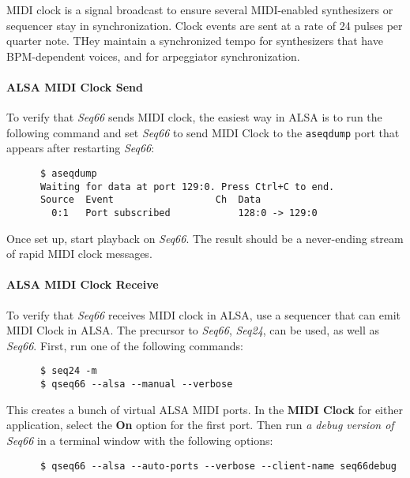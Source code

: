    MIDI clock is a signal broadcast to ensure
   several MIDI-enabled synthesizers or sequencer stay in
   synchronization. Clock events are sent at a rate of 24 pulses per quarter
   note.  THey maintain a synchronized tempo for synthesizers
   that have BPM-dependent voices, and for arpeggiator synchronization.

\paragraph{ALSA MIDI Clock Send}
\label{paragraph:alsa_testing_midi_clock_send}

   To verify that \textsl{Seq66} sends MIDI clock, the easiest way in
   ALSA is to run the following command and set \textsl{Seq66} to send
   MIDI Clock to the \texttt{aseqdump} port that appears after restarting
   \textsl{Seq66}:

   \begin{verbatim}
      $ aseqdump
      Waiting for data at port 129:0. Press Ctrl+C to end.
      Source  Event                  Ch  Data
        0:1   Port subscribed            128:0 -> 129:0
   \end{verbatim}

   Once set up, start playback on \textsl{Seq66}.
   The result should be a never-ending stream of rapid MIDI clock messages.

\paragraph{ALSA MIDI Clock Receive}
\label{paragraph:alsa_testing_midi_clock_receive}

   To verify that \textsl{Seq66} receives MIDI clock in ALSA, use a sequencer
   that can emit MIDI Clock in ALSA.  The precursor to \textsl{Seq66},
   \textsl{Seq24}, can be used, as well as \textsl{Seq66}.
   First, run one of the following commands:

   \begin{verbatim}
      $ seq24 -m
      $ qseq66 --alsa --manual --verbose
   \end{verbatim}

   This creates a bunch of virtual ALSA MIDI ports.
   In the \textbf{MIDI Clock} for either application,
   select the \textbf{On} option for the first port.
   Then run \textsl{a debug version of Seq66} in a terminal window
   with the following options:

   \begin{verbatim}
      $ qseq66 --alsa --auto-ports --verbose --client-name seq66debug
   \end{verbatim}

